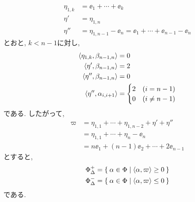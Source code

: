 \begin{align*}
  \eta_{1,k}&=\ee_1+\cdots+\ee_k\\
  \eta'&=\eta_{1,n}\\
  \eta''&=\eta_{1,n-1}-\ee_n=\ee_1+\cdots+\ee_{n-1}-\ee_n
\end{align*}
とおと, $k<n-1$に対し,
\begin{align*}
  \Braket{\eta_{1,k},\beta_{n-1,n}}&=0\\
  \Braket{\eta',\beta_{n-1,n}}&=2\\
  \Braket{\eta'',\beta_{n-1,n}}&=0\\
  \Braket{\eta'',\alpha_{i,i+1}}&=
  \begin{cases}
    2 &(i=n-1)\\
    0 &(i\neq n-1)
  \end{cases}
\end{align*}
である.
したがって,
\begin{align*}
  \varpi&=\eta_{1,1}+\cdots+\eta_{1,n-2}+\eta'+\eta''\\
  &=\eta_{1,1}+\cdots+\eta_{n}-\ee_n\\
  &=n\ee_1+(n-1)\ee_2+\cdots+2\ee_{n-1}
\end{align*}
  とすると,
\begin{align*}
\Phi_\Delta^+&=\Set{\alpha\in\Phi|\Braket{\alpha,\varpi}\geq 0}\\
\Phi_\Delta^-&=\Set{\alpha\in\Phi|\Braket{\alpha,\varpi}\leq 0}
\end{align*}
である.


